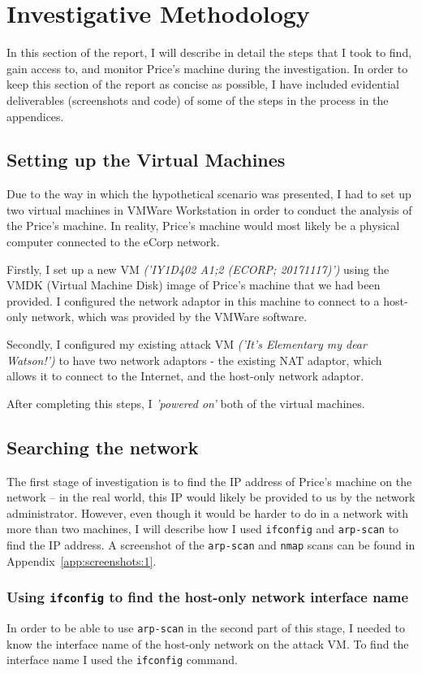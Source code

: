 \documentclass[12pt]{report}
\newcommand{\term}[1]{\colorbox{light-gray}{\texttt{#1}}}
\begin{document}
\pagebreak
\chapter{Investigative Methodology}
In this section of the report, I will describe in detail the steps that I took to find, gain access to, and monitor Price's machine during the investigation. In order to keep this section of the report as concise as possible, I have included evidential deliverables (screenshots and code) of some of the steps in the process in the appendices.


\section*{Setting up the Virtual Machines}
Due to the way in which the hypothetical scenario was presented, I had to set up two virtual machines in VMWare Workstation in order to conduct the analysis of the Price's machine. In reality, Price's machine would most likely be a physical computer connected to the eCorp network.

Firstly, I set up a new VM \textit{('IY1D402 A1;2 (ECORP; 20171117)')} using the VMDK (Virtual Machine Disk) image of Price's machine that we had been provided. I configured the network adaptor in this machine to connect to a host-only network, which was provided by the VMWare software.

Secondly, I configured my existing attack VM \textit{('It's Elementary my dear Watson!')} to have two network adaptors - the existing NAT adaptor, which allows it to connect to the Internet, and the host-only network adaptor.

After completing this steps, I \textit{'powered on'} both of the virtual machines.


\section{Searching the network}
The first stage of investigation is to find the IP address of Price's machine on the network -- in the real world, this IP would likely be provided to us by the network administrator. However, even though it would be harder to do in a network with more than two machines, I will describe how I used \texttt{ifconfig} and \texttt{arp-scan} to find the IP address. A screenshot of the \texttt{arp-scan} and \texttt{nmap} scans can be found in Appendix~\ref{app:screenshots:1}.

\subsection*{Using \texttt{ifconfig} to find the host-only network interface name}
In order to be able to use \texttt{arp-scan} in the second part of this stage, I needed to know the interface name of the host-only network on the attack VM. To find the interface name I used the \term{ifconfig} command.
\end{document}
